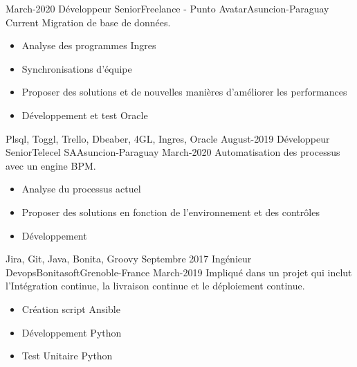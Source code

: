 %
%
%
\begin{experiences}
 \projectexperiences
    {March-2020}   {Développeur Senior}{Freelance - Punto Avatar}{Asuncion-Paraguay}
    {Current} {Migration de base de données.}
                  {    \begin{itemize}
                          \item Analyse des programmes Ingres
                          \item Synchronisations d'équipe
                          \item Proposer des solutions et de nouvelles manières d'améliorer les performances
                          \item Développement et test Oracle
                       \end{itemize}
                  }
                      {Plsql, Toggl, Trello, Dbeaber, 4GL, Ingres, Oracle}
  \emptySeparator
 \projectexperiences
    {August-2019}   {Développeur Senior}{Telecel SA}{Asuncion-Paraguay}
    {March-2020} {Automatisation des processus avec un engine BPM.}
                  {
                      \begin{itemize}
                          \item Analyse du processus actuel
                          \item Proposer des solutions en fonction de l'environnement et des contrôles
                          \item Développement
                       \end{itemize}
                  }
                      {Jira, Git, Java, Bonita, Groovy}
  \emptySeparator
  \projectexperiences
    {Septembre 2017}   {Ingénieur Devops}{Bonitasoft}{Grenoble-France}
    {March-2019}
                    {Impliqué dans un projet qui inclut l'Intégration continue, la livraison continue et le déploiement continue.}
                    {
                      \begin{itemize}
                        \item Création script Ansible
                        \item Développement Python
                        \item Test Unitaire Python

\end{itemize}}
\end{experiences}
